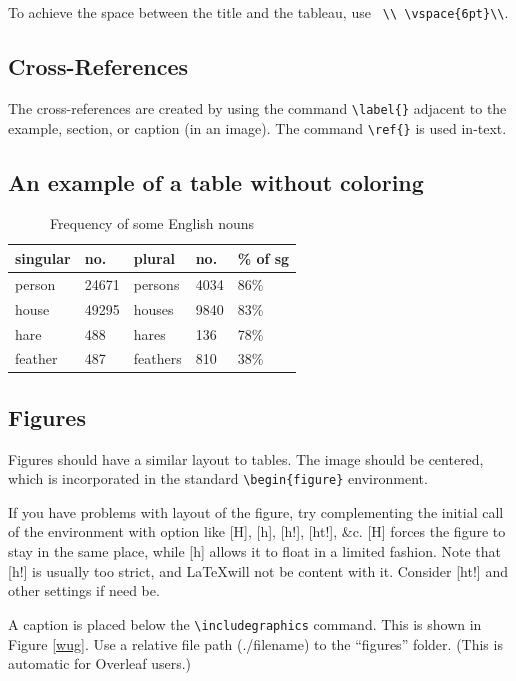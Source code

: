 \documentclass[11pt, letterpaper]{article}
\begin{document}
To achieve the space between the title and the tableau, use \verb= \\ \vspace{6pt}\\=.

\subsection{Cross-References}
The cross-references are created by using the command \verb=\label{}= adjacent to the example, section, or caption (in an image). The command \verb=\ref{}= is used in-text.

\subsection{An example of a table without coloring}
\begin{table}[H]
\centering
\caption{Frequency of some English nouns}
\begin{tabular}{lllll}
\hline
singular & no. & plural & no. & \% of sg \\
\hline
person & 24671 & persons & 4034 & 86\% \\
house & 49295 & houses & 9840 & 83\% \\
hare & 488 & hares & 136 & 78\% \\
feather & 487 & feathers & 810 & 38\% \\
\hline
\end{tabular}
\label{table}
\end{table}

\subsection{Figures} \label{fig}
Figures should have a similar layout to tables. The image should be centered, which is incorporated in the standard \verb=\begin{figure}= environment.

If you have problems with layout of the figure, try complementing the initial call of the environment with option like [H], [h], [h!], [ht!], \&c. [H] forces the figure to stay in the same place, while [h] allows it to float in a limited fashion. Note that [h!] is usually too strict, and \LaTeX will not be content with it. Consider [ht!] and other settings if need be.

A caption is placed below the \verb=\includegraphics= command. This is shown in Figure \ref{wug}. Use a relative file path (./filename) to the ``figures'' folder. (This is automatic for Overleaf users.)
\end{document}
